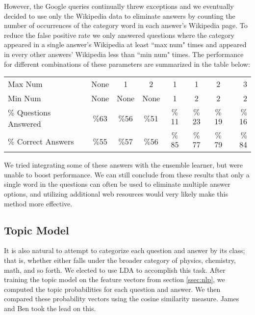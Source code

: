 \documentclass{article}
\theoremstyle{mystuff}
\theoremstyle{myexample}
\theoremstyle{named}
\begin{document}
However, the Google queries continually threw exceptions and we eventually decided to use only the Wikipedia data to eliminate answers by counting the number of occurrences of the category word in each answer's Wikipedia page. To reduce the false positive rate we only answered questions where the category appeared in a single answer's Wikipedia at least ``max num" times and appeared in every other answers' Wikipedia less than ``min num" times. The performance for different combinations  of these parameters are summarized in the table below:\\

\begin{center}
\begin{tabular}{l*{6}{c}r}
Max Num             & None & 1 & 2 & 1 & 1  & 2 & 3 \\
Min Num             & None & None & None & 1 & 2  & 2 & 2 \\
\hline
$\%$ Questions Answered & $\%$63 & $\%$56 & $\%$51 & $\%$11 & $\%$23 & $\%$19 & $\%$16  \\
$\%$ Correct Answers  & $\%$55 & $\%$57 & $\%$56 & $\%$85 &  $\%$77 & $\%$79 &  $\%$84  \\
\end{tabular}
\end{center}

We tried integrating some of these answers with the ensemble learner, but were unable to boost performance. We can still conclude from these results that only a single word in the questions can often be used to eliminate multiple answer options, and utilizing additional web resources would very likely make this method more effective.


\subsection{Topic Model}
\label{ssec:topic_model}
It is also natural to attempt to categorize each question and answer by its class; that is, whether either falls under the broader category of physics, chemistry, math, and so forth.  We elected to use LDA to accomplish this task.  After training the topic model on the feature vectors from section \ref{ssec:nlp}, we computed the topic probabilities for each question and answer.  We then compared these probability vectors using the cosine similarity measure.  James and Ben took the lead on this.\\
\end{document}
